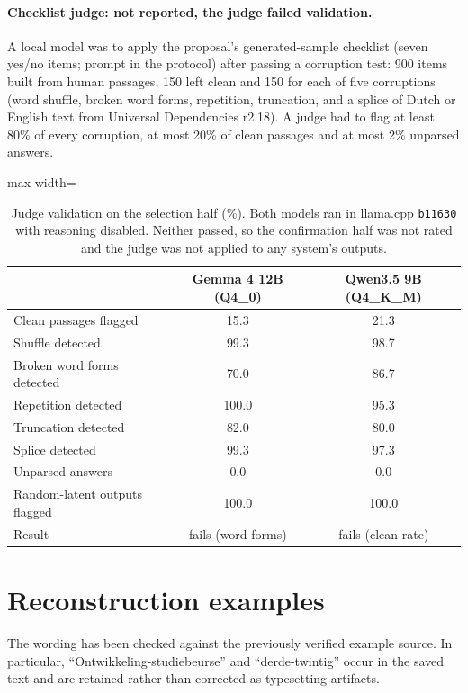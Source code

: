 \documentclass[11pt,a4paper]{article}
\begin{document}
\paragraph{Checklist judge: not reported, the judge failed validation.} A local model was to apply the proposal's generated-sample checklist (seven yes/no items; prompt in the protocol) after passing a corruption test: 900 items built from human passages, 150 left clean and 150 for each of five corruptions (word shuffle, broken word forms, repetition, truncation, and a splice of Dutch or English text from Universal Dependencies r2.18). A judge had to flag at least 80\% of every corruption, at most 20\% of clean passages and at most 2\% unparsed answers.

\begin{table}[h]
\centering
\small
\begin{adjustbox}{max width=\columnwidth}
\begin{tabular}{lcc}
\toprule
& Gemma 4 12B (Q4\_0) & Qwen3.5 9B (Q4\_K\_M) \\
\midrule
Clean passages flagged & 15.3 & 21.3 \\
Shuffle detected & 99.3 & 98.7 \\
Broken word forms detected & 70.0 & 86.7 \\
Repetition detected & 100.0 & 95.3 \\
Truncation detected & 82.0 & 80.0 \\
Splice detected & 99.3 & 97.3 \\
Unparsed answers & 0.0 & 0.0 \\
Random-latent outputs flagged & 100.0 & 100.0 \\
\midrule
Result & fails (word forms) & fails (clean rate) \\
\bottomrule
\end{tabular}
\end{adjustbox}
\caption{Judge validation on the selection half (\%). Both models ran in llama.cpp \texttt{b11630} with reasoning disabled. Neither passed, so the confirmation half was not rated and the judge was not applied to any system's outputs.}
\label{tab:judge}
\end{table}

\section{Reconstruction examples}
\label{app:examples}

The wording has been checked against the previously verified example source. In particular, ``Ontwikkeling-studiebeurse'' and ``derde-twintig'' occur in the saved text and are retained rather than corrected as typesetting artifacts.
\end{document}
